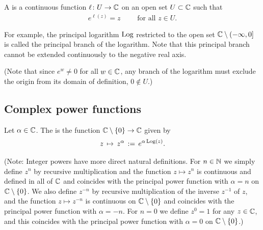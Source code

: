 \begin{definition}
  \label{def:branch_of_log}
  A  is a continuous function
  $\ell \colon U \to \mathbb{C}$ on an open set $U \subset \mathbb{C}$ such that
  \begin{align*}
    e^{\ell(z)} = z \qquad \text{ for all } z \in U .
  \end{align*}

  For example, the principal logarithm $\mathrm{Log}$
  restricted to the open set $\mathbb{C} \setminus (-\infty,0]$
  is called the principal branch of the logarithm. Note that
  this principal branch cannot be extended continuously to
  the negative real axis.

  (Note that since $e^w \ne 0$ for all $w \in \mathbb{C}$, any branch
  of the logarithm must exclude the origin from its domain of
  definition, $0 \notin U$.)
\end{definition}

\subsection{Complex power functions}

\begin{definition}
  \label{def:principal_complex_power}
  Let $\alpha \in \mathbb{C}$. The  is the function $\mathbb{C} \setminus \left\{ 0 \right\} \to \mathbb{C}$
  given by
  \begin{align*}
    z \, \mapsto \, z^\alpha \, := \, e^{\alpha \, \mathrm{Log}(z)} .
  \end{align*}

  (Note: Integer powers have more direct natural definitions.
  For $n \in \mathbb{N}$ we simply define $z^n$ by recursive multiplication
  and the function $z \mapsto z^n$ is continuous and defined in
  all of $\mathbb{C}$ and coincides with the principal power function
  with $\alpha = n$ on $\mathbb{C} \setminus \left\{ 0 \right\}$.
  We also define $z^{-n}$ by recursive multiplication of the
  inverse $z^{-1}$ of $z$, and the function $z \mapsto z^{-n}$
  is continuous on $\mathbb{C} \setminus \left\{ 0 \right\}$ and coincides with
  the principal power function with $\alpha = -n$.
  For $n = 0$ we define $z^0 = 1$ for any $z \in \mathbb{C}$, and this
  coincides with the principal power function with $\alpha = 0$
  on $\mathbb{C} \setminus \left\{ 0 \right\}$.)
\end{definition}

